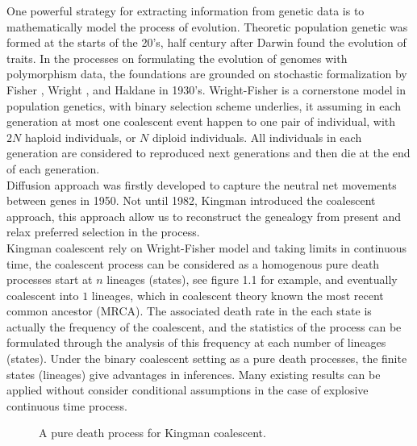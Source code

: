 \documentclass[12pt, a4paper,twoside]{report}
\makeatletter
\theoremstyle{definition}
\theoremstyle{myplain}
\theoremstyle{mypro}
\def\label#1{\@bsphack\protected@write\@auxout{}{\string\newlabel{#1}{{\@currentlabel}{\thepage}}}\@esphack}
\makeatother
\begin{document}
One powerful strategy for extracting information from genetic data is to mathematically model the process of evolution. Theoretic population genetic was formed at the starts of the 20’s, half century after Darwin found the evolution of traits. In the processes on formulating the evolution of genomes with polymorphism data, the foundations are grounded on stochastic formalization by Fisher \cite{Fisher}, Wright \cite{Wright}, and Haldane \cite{Haldane} in 1930’s. Wright-Fisher is a cornerstone model in population genetics, with binary selection scheme underlies, it assuming in each generation at most one coalescent event happen to one pair of individual, with $2N$ haploid individuals, or $N$ diploid individuals. All individuals in each generation are considered to reproduced next generations and then die at the end of each generation.\\

Diffusion approach was firstly developed to capture the neutral net movements between genes in 1950. Not until 1982, Kingman \cite{Kingman} introduced the coalescent approach, this approach allow us to reconstruct the genealogy from present and relax preferred selection in the process.\\

Kingman coalescent rely on Wright-Fisher model and taking limits in continuous time, the coalescent process can be considered as a homogenous pure death processes start at $n$ lineages (states), see figure 1.1 for example, and eventually coalescent into $1$ lineages, which in coalescent theory known the most recent common ancestor (MRCA). The associated death rate in the each state is actually the frequency of the coalescent, and the statistics of the process can be formulated through the analysis of this frequency at each number of lineages (states). Under the binary coalescent setting as a pure death processes, the finite states (lineages) give advantages in inferences. Many existing results can be applied without consider conditional assumptions in the case of explosive continuous time process.\\

\begin{figure}[!h]
\label{Fig:Pure Death Process}
\begin{center}
\end{center}
\caption{A pure death process for Kingman coalescent.}
\end{figure}
\end{document}
